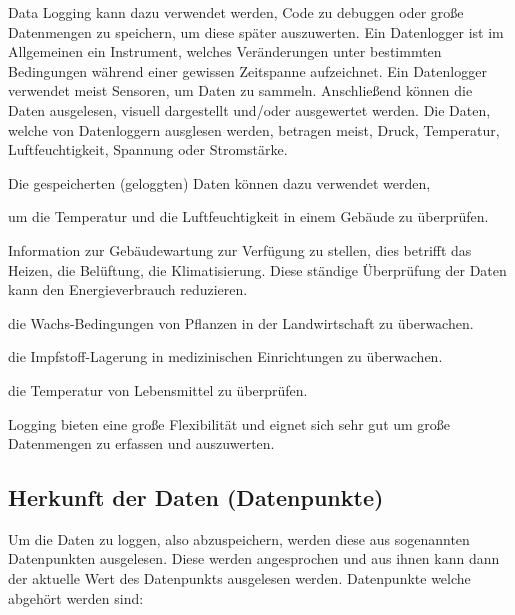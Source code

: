 
Data Logging kann dazu verwendet werden, Code zu debuggen oder große Datenmengen zu speichern, um diese später auszuwerten. Ein Datenlogger ist im Allgemeinen ein Instrument, welches Veränderungen unter bestimmten Bedingungen während einer gewissen Zeitspanne aufzeichnet. Ein Datenlogger verwendet meist Sensoren, um Daten zu sammeln. Anschließend können die Daten ausgelesen, visuell dargestellt und/oder ausgewertet werden. Die Daten, welche von Datenloggern ausglesen werden, betragen meist, Druck, Temperatur, Luftfeuchtigkeit, Spannung oder Stromstärke. \cite{DataLogging} 

Die gespeicherten (geloggten) Daten können dazu verwendet werden, 

\begin{compactitem}
    \item um die Temperatur und die Luftfeuchtigkeit in einem Gebäude zu überprüfen.
    \item Information zur Gebäudewartung zur Verfügung zu stellen, dies betrifft das Heizen, die Belüftung, die Klimatisierung. Diese ständige Überprüfung der Daten kann den Energieverbrauch reduzieren.
    \item die Wachs-Bedingungen von Pflanzen in der Landwirtschaft zu überwachen. 
    \item die Impfstoff-Lagerung in medizinischen Einrichtungen zu überwachen. 
    \item die Temperatur von Lebensmittel zu überprüfen.
\end{compactitem}
\cite{DataLogging}

Logging bieten eine große Flexibilität und eignet sich sehr gut um große Datenmengen zu erfassen und auszuwerten. \cite{BigDataBuch}

\subsection{Herkunft der Daten (Datenpunkte)}
Um die Daten zu loggen, also abzuspeichern, werden diese aus sogenannten Datenpunkten ausgelesen. Diese werden angesprochen und aus ihnen kann dann der aktuelle Wert des Datenpunkts ausgelesen werden.
Datenpunkte welche abgehört werden sind: 

